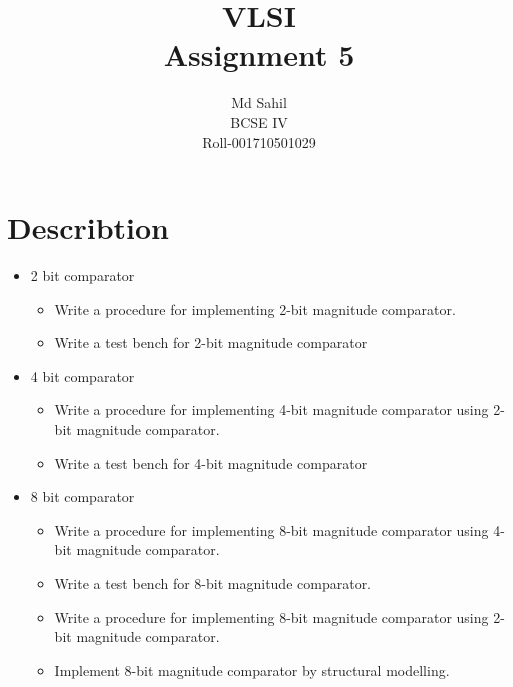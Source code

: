 \documentclass[titlepage]{article}
\title{VLSI \\Assignment 5}
\author{Md Sahil\\BCSE IV\\Roll-001710501029}
\date{}
\begin{document}
    {\maketitle}

    \section{Describtion}
    \begin{itemize}
        \item 2 bit comparator
        \begin{itemize}
        \item Write a procedure for implementing 2-bit magnitude comparator.
        \item Write a test bench for 2-bit magnitude comparator
        \end{itemize}
    \item 4 bit comparator
        \begin{itemize}
            \item Write a procedure for implementing 4-bit magnitude comparator using 2-bit magnitude comparator.
            \item Write a test bench for 4-bit magnitude comparator
        \end{itemize}
    \item 8 bit comparator
        \begin{itemize}
            \item Write a procedure for implementing 8-bit magnitude comparator using 4-bit magnitude comparator.
            \item Write a test bench for 8-bit magnitude comparator.
            \item Write a procedure for implementing 8-bit magnitude comparator using 2-bit magnitude comparator.
            \item Implement 8-bit magnitude comparator by structural modelling.
        \end{itemize}
    \end{itemize}
\end{document}
